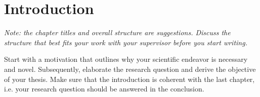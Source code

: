 \chapter{Introduction}

{\color{orange}
    \textit{Note: the chapter titles and overall structure are suggestions. Discuss the structure that best fits your work with your supervisor before you start writing.}
    \vspace{1em}

    Start with a motivation that outlines why your scientific endeavor is necessary and novel.
    Subsequently, elaborate the research question and derive the objective of your thesis. 
    Make sure that the introduction is coherent with the last chapter, i.e. your research question should be answered in the conclusion.
}

